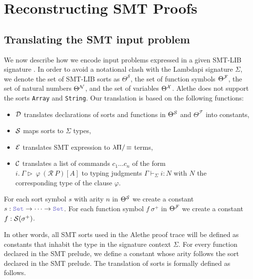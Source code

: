\chapter{Reconstructing SMT Proofs}\label{ch:reconstruction}

\section{Translating the SMT input problem}

We now describe how we encode input problems expressed in a given
SMT-LIB signature \cite[\S 5.2.1]{smtlib}. In order to avoid a notational clash with the Lambdapi signature $\Sigma$, we denote the set of SMT-LIB sorts as $\Theta^\mathcal{S}$, the set of function symbols $\Theta^\cal{F}$, the set of natural numbers $\Theta^\cal{N}$, and the set of variables $\Theta^\cal{X}$.
Alethe does not support the sorts \texttt{Array} and \texttt{String}. Our translation is based on the following functions:
\begin{itemize}
\item $\cal{D}$ translates declarations of sorts and functions in $\Theta^\cal{S}$ and $\Theta^\mathcal{F}$ into constants,
\item $\cal{S}$ maps sorts to $\Sigma$ types,
\item $\cal{E}$ translates SMT expression to $\lpm$ terms,
\item $\cal{C}$ translates a list of commands  $c_1 \dots c_n$ of the form\\
  $i.~\Gamma \triangleright~\varphi~(\mathcal{R}~P)[A]$ to typing judgments $\Gamma \vdash_\Sigma i : N$ with $N$ the corresponding type of the clause $\varphi$.
\end{itemize}

\smallskip

\begin{definition}
For each sort symbol $s$ with arity $n$ in $\Theta^\cal{S}$ we create a constant $s: \set \ra \dots \ra \set$.
For each function symbol $f~\sigma^+$ in $\Theta^\cal{F}$ we create a constant $f: \cal{S}(\sigma^+)$.
\label{def:function-d}
\end{definition}

\smallskip

In other words, all SMT sorts used in the Alethe proof trace will be defined as constants that inhabit the type \set{} in the signature context $\Sigma$.
For every function declared in the SMT prelude, we define a constant whose arity follows the sort declared in the SMT prelude. The translation of sorts is formally defined as follows.

